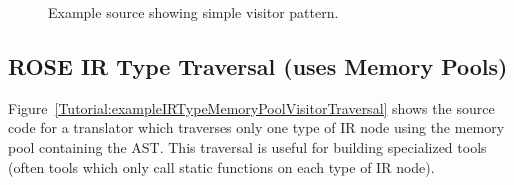 \begin{figure}[!h]
{\indent
{\mySmallFontSize


\begin{latexonly}
   
\end{latexonly}

\begin{htmlonly}
   
\end{htmlonly}

}
}
\caption{Example source showing simple visitor pattern.}
\label{Tutorial:exampleMemoryPoolVisitorPattern}
\end{figure}



\clearpage
\subsection{ROSE IR Type Traversal (uses Memory Pools)}

Figure~\ref{Tutorial:exampleIRTypeMemoryPoolVisitorTraversal} shows the source code 
for a translator which traverses only one type of IR node using the memory pool 
containing the AST.  This traversal is useful for building specialized tools
(often tools which only call static functions on each type of IR node).

